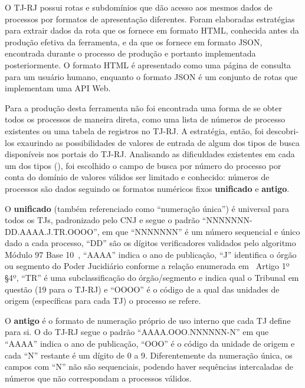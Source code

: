 O TJ-RJ possui rotas e subdomínios que dão acesso aos mesmos dados de processos
por formatos de apresentação diferentes. Foram elaboradas estratégias para
extrair dados da rota que os fornece em formato HTML, conhecida antes da
produção efetiva da ferramenta, e da que os fornece em formato JSON, encontrada
durante o processo de produção e portanto implementada posteriormente. O
formato HTML é apresentado como uma página de consulta para um usuário humano,
enquanto o formato JSON é um conjunto de rotas que implementam uma API Web.

Para a produção desta ferramenta não foi encontrada uma forma de se obter todos
os processos de maneira direta, como uma lista de números de processo
existentes ou uma tabela de registros no TJ-RJ. A estratégia, então, foi
descobri-los exaurindo as possibilidades de valores de entrada de algum dos
tipos de busca disponíveis nos portais do TJ-RJ. Analisando as dificuldades
existentes em cada um dos tipos (), foi
escolhido o campo de busca por número do processo por conta do domínio de
valores válidos ser limitado e conhecido: números de processos são dados
seguindo os formatos numéricos fixos \textbf{unificado} e \textbf{antigo}.

O \textbf{unificado} (também referenciado como ``numeração única'') é universal
para todos os TJs, padronizado pelo CNJ
\cite{spec:cnj-numeração-única,spec:cnj-numeração-única-resolução} e segue o
padrão ``NNNNNNN-DD.AAAA.J.TR.OOOO'', em que ``NNNNNNN'' é um número sequencial
e único dado a cada processo, ``DD'' são os dígitos verificadores validados
pelo algoritmo Módulo 97 Base 10~\cite{spec:iso-modulo-97}, ``AAAA'' indica o
ano de publicação, ``J'' identifica o órgão ou segmento do Poder Jucidiário
conforme a relação enumerada em~\cite{spec:cnj-numeração-única-resolução}
Artigo 1º \S 4º, ``TR'' é uma subclassificação do órgão/segmento e indica qual
o Tribunal em questão (19 para o TJ-RJ) e ``OOOO'' é o código de a qual das
unidades de origem (específicas para cada TJ) o processo se refere.

O \textbf{antigo} é o formato de numeração próprio de uso interno que cada TJ
define para si. O do TJ-RJ segue o padrão ``AAAA.OOO.NNNNNN-N'' em que ``AAAA''
indica o ano de publicação, ``OOO'' é o código da unidade de origem e cada
``N'' restante é um dígito de 0 a 9. Diferentemente da numeração única, os
campos com ``N'' não são sequenciais, podendo haver sequências intercaladas de
números que não correspondam a processos válidos.

